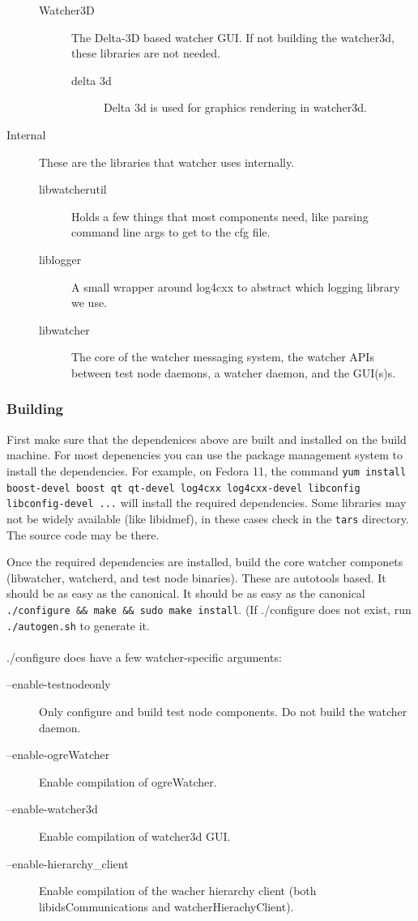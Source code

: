 \documentclass{article}
\begin{document}
\begin{description}
\begin{description}
\item[Watcher3D] The Delta-3D based watcher GUI. If not building the watcher3d, these libraries are not needed. 
\begin{description}
\item[delta 3d] Delta 3d is used for graphics rendering in watcher3d. 
\end{description}
\end{description}
\item[Internal] These are the libraries that watcher uses internally. 
\begin{description}
\item[libwatcherutil] Holds a few things that most components need, like parsing command line args to get to the cfg file.
\item[liblogger] A small wrapper around log4cxx to abstract which logging library we use. 
\item[libwatcher] The core of the watcher messaging system, the watcher APIs between test node daemons, a watcher daemon, and the GUI(s)s.
\end{description}
\end{description}

\subsubsection{Building}

First make sure that the dependenices above are built and installed on the build machine. For most depenencies you can use the package management system to install 
the dependencies. For example, on Fedora 11, the command {\tt yum install boost-devel boost qt qt-devel log4cxx log4cxx-devel libconfig libconfig-devel ...} will install the 
required dependencies. Some libraries may not be widely available (like libidmef), in these cases check in the {\tt tars} directory. The source code may be there. 

Once the required dependencies are installed, build the core watcher componets (libwatcher, watcherd, and test node binaries). These are autotools based. It should be as easy 
as the canonical. It should be as easy as the canonical {\tt .\slash configure \&\& make \&\& sudo make install}. (If .\slash configure does not exist, run {\tt .\slash autogen.sh} to generate it. 
\\\\
.\slash configure does have a few watcher-specific arguments:
\begin{description}
\item[--enable-testnodeonly]   Only configure and build test node components. Do not build the watcher daemon.
\item[--enable-ogreWatcher]    Enable compilation of ogreWatcher.
\item[--enable-watcher3d]      Enable compilation of watcher3d GUI.
\item[--enable-hierarchy\_client] Enable compilation of the wacher hierarchy client (both libidsCommunications and watcherHierachyClient). 
\end{description}
\end{document}
